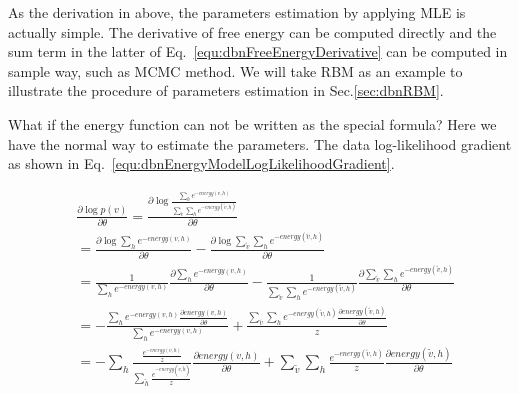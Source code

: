 \documentclass[runningheads,openany]{xhlPaper}
\begin{document}
As the derivation in above, the parameters estimation by applying MLE is actually simple. The derivative of free energy can be computed directly and the sum term in the latter of Eq.~\ref{equ:dbnFreeEnergyDerivative} can be computed in sample way, such as MCMC method. We will take RBM as an example to illustrate the procedure of parameters estimation in Sec.\ref{sec:dbnRBM}.

What if the energy function can not be written as the special formula? Here we have the normal way to estimate the parameters.
The data log-likelihood gradient as shown in Eq.~\ref{equ:dbnEnergyModelLogLikelihoodGradient}.

\begin{equation}
\label{equ:dbnEnergyModelLogLikelihoodGradient}
\begin{aligned}
&\frac{{\partial \log p\left( v \right)}}{{\partial \theta }} = \frac{{\partial \log \frac{{\sum\limits_h {{e^{ - energy\left( {v,h} \right)}}} }}{{\sum\limits_{\tilde v} {\sum\limits_h {{e^{ - energy\left( {\tilde v,h} \right)}}} } }}}}{{\partial \theta }}\\
 & = \frac{{\partial \log \sum\limits_h {{e^{ - energy\left( {v,h} \right)}}} }}{{\partial \theta }} - \frac{{\partial \log \sum\limits_{\tilde v} {\sum\limits_h {{e^{ - energy\left( {\tilde v,h} \right)}}} } }}{{\partial \theta }}\\
 &= \frac{1}{{\sum\limits_h {{e^{ - energy\left( {v,h} \right)}}} }}\frac{{\partial \sum\limits_h {{e^{ - energy\left( {v,h} \right)}}} }}{{\partial \theta }} - \frac{1}{{\sum\limits_{\tilde v} {\sum\limits_h {{e^{ - energy\left( {\tilde v,h} \right)}}} } }}\frac{{\partial \sum\limits_{\tilde v} {\sum\limits_h {{e^{ - energy\left( {\tilde v,h} \right)}}} } }}{{\partial \theta }}\\
 & =  - \frac{{\sum\limits_h {{e^{ - energy\left( {v,h} \right)}}\frac{{\partial energy\left( {v,h} \right)}}{{\partial \theta }}} }}{{\sum\limits_h {{e^{ - energy\left( {v,h} \right)}}} }} + \frac{{\sum\limits_{\tilde v} {\sum\limits_h {{e^{ - energy\left( {\tilde v,h} \right)}}\frac{{\partial energy\left( {\tilde v,h} \right)}}{{\partial \theta }}} } }}{z}\\
 & =  - \sum\limits_h {\frac{{\frac{{{e^{ - energy\left( {v,h} \right)}}}}{z}}}{{\sum\limits_{\tilde h} {\frac{{{e^{ - energy\left( {v,\tilde h} \right)}}}}{z}} }}\frac{{\partial energy\left( {v,h} \right)}}{{\partial \theta }}}  + \sum\limits_{\tilde v} {\sum\limits_h {\frac{{{e^{ - energy\left( {\tilde v,h} \right)}}}}{z}\frac{{\partial energy\left( {\tilde v,h} \right)}}{{\partial \theta }}} } \\

\end{aligned}
\end{equation}
\end{document}
